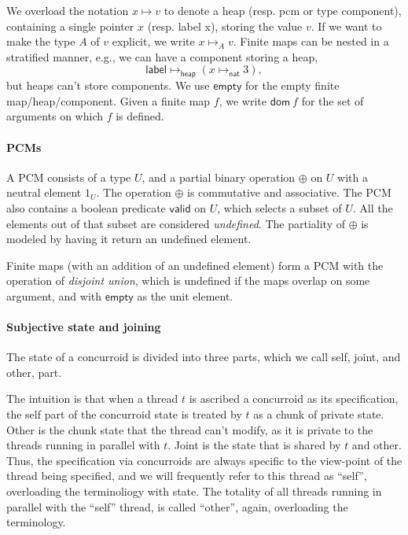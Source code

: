 We overload the notation $x \mapsto v$ to denote a heap (resp. pcm or
type component), containing a single pointer $x$ (resp. label x),
storing the value $v$. If we want to make the type $A$ of $v$
explicit, we write $x \mapsto_A v$. Finite maps can be nested in a
stratified manner, e.g., we can have a component storing a heap,
\[
\mathsf{label} \mapsto_{\mathsf{heap}} (x \mapsto_{\mathsf{nat}} 3),\]
%
but heaps can't store components. We use $\mathsf{empty}$ for the
empty finite map/heap/component. Given a finite map $f$, we write
$\mathsf{dom}\ f$ for the set of arguments on which $f$ is defined.


\paragraph{PCMs}
A PCM consists of a type $U$, and a partial binary operation $\oplus$
on $U$ with a neutral element $1_U$. The operation $\oplus$ is
commutative and associative. The PCM also contains a boolean predicate
$\mathsf{valid}$ on $U$, which selects a subset of $U$. All the
elements out of that subset are considered \emph{undefined}. The
partiality of $\oplus$ is modeled by having it return an undefined
element.

Finite maps (with an addition of an undefined element) form a PCM with
the operation of \emph{disjoint union}, which is undefined if the maps
overlap on some argument, and with $\mathsf{empty}$ as the unit
element.

\paragraph{Subjective state and joining}

The state of a concurroid is divided into three parts, which we call
self, joint, and other, part.

The intuition is that when a thread $t$ is ascribed a concurroid as
its specification, the self part of the concurroid state is treated by
$t$ as a chunk of private state. Other is the chunk state that the
thread can't modify, as it is private to the threads running in
parallel with $t$. Joint is the state that is shared by $t$ and
other. Thus, the specification via concurroids are always specific to
the view-point of the thread being specified, and we will frequently
refer to this thread as ``self'', overloading the terminoliogy with
state.  The totality of all threads running in parallel with the
``self'' thread, is called ``other'', again, overloading the
terminology.

